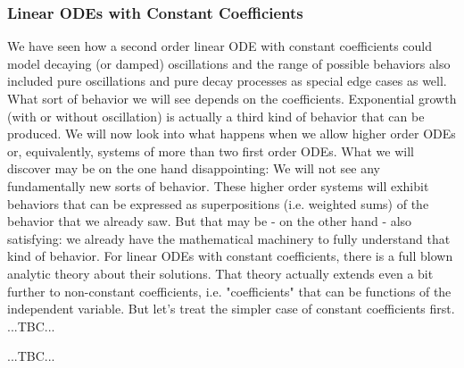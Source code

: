 \subsubsection{Linear ODEs with Constant Coefficients}
We have seen how a second order linear ODE with constant coefficients could model decaying (or damped) oscillations and the range of possible behaviors also included pure oscillations and pure decay processes as special edge cases as well. What sort of behavior we will see depends on the coefficients. Exponential growth (with or without oscillation) is actually a third kind of behavior that can be produced. We will now look into what happens when we allow higher order ODEs or, equivalently, systems of more than two first order ODEs. What we will discover may be on the one hand disappointing: We will not see any fundamentally new sorts of behavior. These higher order systems will exhibit behaviors that can be expressed as superpositions (i.e. weighted sums) of the behavior that we already saw. But that may be - on the other hand - also satisfying: we already have the mathematical machinery to fully understand that kind of behavior. For linear ODEs with constant coefficients, there is a full blown analytic theory about their solutions. That theory actually extends even a bit further to non-constant coefficients, i.e. "coefficients" that can be functions of the independent variable. But let's treat the simpler case of constant coefficients first. ...TBC...

...TBC...










